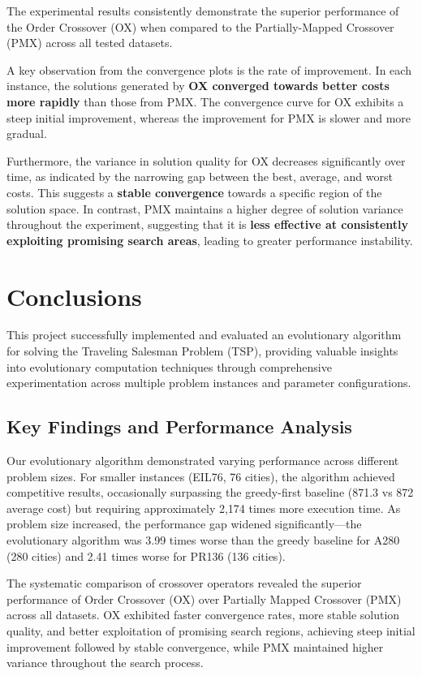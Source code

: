 \documentclass{scrartcl}
\begin{document}
The experimental results consistently demonstrate the superior performance of the Order Crossover (OX) when compared to the Partially-Mapped Crossover (PMX) across all tested datasets.

A key observation from the convergence plots is the rate of improvement. In each instance, the solutions generated by \textbf{OX converged towards better costs more rapidly} than those from PMX. The convergence curve for OX exhibits a steep initial improvement, whereas the improvement for PMX is slower and more gradual. 

Furthermore, the variance in solution quality for OX decreases significantly over time, as indicated by the narrowing gap between the best, average, and worst costs. This suggests a \textbf{stable convergence} towards a specific region of the solution space. In contrast, PMX maintains a higher degree of solution variance throughout the experiment, suggesting that it is \textbf{ less effective at consistently exploiting promising search areas}, leading to greater performance instability.


\section{Conclusions}
\label{sec:conclusions}

This project successfully implemented and evaluated an evolutionary algorithm for solving the Traveling Salesman Problem (TSP), providing valuable insights into evolutionary computation techniques through comprehensive experimentation across multiple problem instances and parameter configurations.

\subsection{Key Findings and Performance Analysis}

Our evolutionary algorithm demonstrated varying performance across different problem sizes. For smaller instances (EIL76, 76 cities), the algorithm achieved competitive results, occasionally surpassing the greedy-first baseline (871.3 vs 872 average cost) but requiring approximately 2,174 times more execution time. As problem size increased, the performance gap widened significantly—the evolutionary algorithm was 3.99 times worse than the greedy baseline for A280 (280 cities) and 2.41 times worse for PR136 (136 cities).

The systematic comparison of crossover operators revealed the superior performance of Order Crossover (OX) over Partially Mapped Crossover (PMX) across all datasets. OX exhibited faster convergence rates, more stable solution quality, and better exploitation of promising search regions, achieving steep initial improvement followed by stable convergence, while PMX maintained higher variance throughout the search process.
\end{document}
